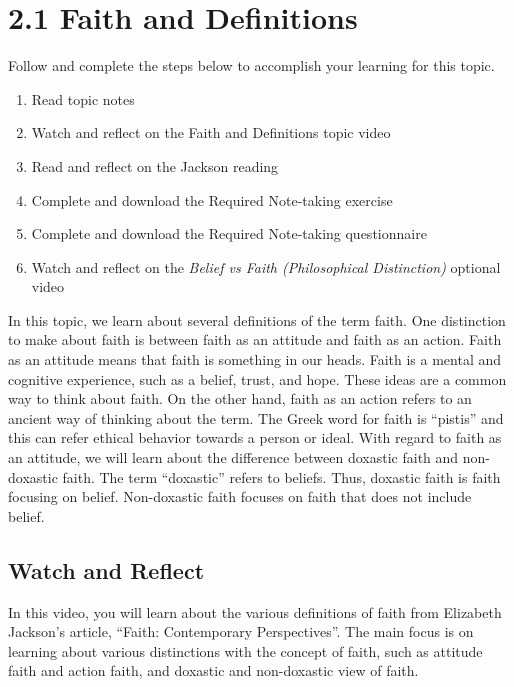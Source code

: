 \documentclass[
]{book}
\providecommand{\tightlist}{%
  \setlength{\itemsep}{0pt}\setlength{\parskip}{0pt}}
\begin{document}
\hypertarget{faith-and-definitions}{%
\section*{2.1 Faith and Definitions}\label{faith-and-definitions}}

Follow and complete the steps below to accomplish your learning for this topic.

\begin{enumerate}
\def\labelenumi{\arabic{enumi}.}
\tightlist
\item
  Read topic notes
\item
  Watch and reflect on the Faith and Definitions topic video
\item
  Read and reflect on the Jackson reading
\item
  Complete and download the Required Note-taking exercise
\item
  Complete and download the Required Note-taking questionnaire
\item
  Watch and reflect on the \emph{Belief vs Faith (Philosophical Distinction)} optional video
\end{enumerate}

In this topic, we learn about several definitions of the term faith. One distinction to make about faith is between faith as an attitude and faith as an action. Faith as an attitude means that faith is something in our heads. Faith is a mental and cognitive experience, such as a belief, trust, and hope. These ideas are a common way to think about faith. On the other hand, faith as an action refers to an ancient way of thinking about the term. The Greek word for faith is ``pistis'' and this can refer ethical behavior towards a person or ideal. With regard to faith as an attitude, we will learn about the difference between doxastic faith and non-doxastic faith. The term ``doxastic'' refers to beliefs. Thus, doxastic faith is faith focusing on belief. Non-doxastic faith focuses on faith that does not include belief.

\hypertarget{watch-and-reflect-9}{%
\subsection*{Watch and Reflect}\label{watch-and-reflect-9}}

In this video, you will learn about the various definitions of faith from Elizabeth Jackson's article, ``Faith: Contemporary Perspectives''. The main focus is on learning about various distinctions with the concept of faith, such as attitude faith and action faith, and doxastic and non-doxastic view of faith.
\end{document}
